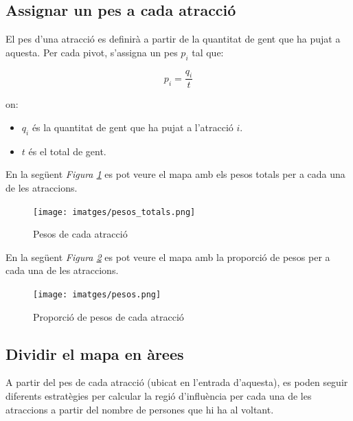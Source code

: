 \documentclass[12pt]{article}
\begin{document}
\subsection{Assignar un pes a cada atracció}
El pes d'una atracció es definirà a partir de la quantitat de gent que ha pujat a aquesta. Per cada pivot, s'assigna un pes $p_{i}$ tal que:
 
$$p_{i} = \frac{q_{i}}{t}$$

on:
\begin{itemize}
	\item $q_{i}$ és la quantitat de gent que ha pujat a l'atracció $i$.
	\item $t$ és el total de gent.
\end{itemize}

En la següent \textit{Figura \ref{fig:mapa_areas_totals}} es pot veure el mapa amb els pesos totals per a cada una de les atraccions.

\begin{figure}[H]
	\centering
	\texttt{[image: imatges/pesos\_totals.png]}\par\vspace{1cm}
	\caption{Pesos de cada atracció}
	\label{fig:mapa_areas_totals}
\end{figure}

En la següent \textit{Figura \ref{fig:mapa_areas}} es pot veure el mapa amb la proporció de pesos per a cada una de les atraccions.

\begin{figure}[H]
	\centering
	\texttt{[image: imatges/pesos.png]}\par\vspace{1cm}
	\caption{Proporció de pesos de cada atracció}
	\label{fig:mapa_areas}
\end{figure}

\subsection{Dividir el mapa en àrees \label{arees}}
A partir del pes de cada atracció (ubicat en l'entrada d'aquesta), es poden seguir diferents estratègies per calcular la regió d'influència per cada una de les atraccions a partir del nombre de persones que hi ha al voltant.
\end{document}
